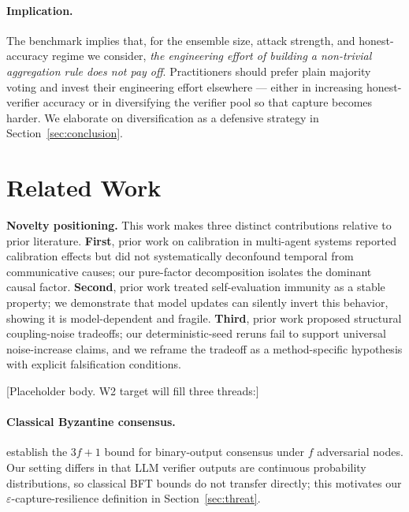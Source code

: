 \documentclass[11pt]{article}
\begin{document}
\paragraph{Implication.}
The benchmark implies that, for the ensemble size, attack strength,
and honest-accuracy regime we consider, \emph{the engineering effort
of building a non-trivial aggregation rule does not pay off}.
Practitioners should prefer plain majority voting and invest their
engineering effort elsewhere --- either in increasing honest-verifier
accuracy or in diversifying the verifier pool so that capture becomes
harder. We elaborate on diversification as a defensive strategy in
Section~\ref{sec:conclusion}.

\section{Related Work}
\textbf{Novelty positioning.} This work makes three distinct contributions relative to prior literature. \textbf{First}, prior work on calibration in multi-agent systems reported calibration effects but did not systematically deconfound temporal from communicative causes; our pure-factor decomposition isolates the dominant causal factor. \textbf{Second}, prior work treated self-evaluation immunity as a stable property; we demonstrate that model updates can silently invert this behavior, showing it is model-dependent and fragile. \textbf{Third}, prior work proposed structural coupling-noise tradeoffs; our deterministic-seed reruns fail to support universal noise-increase claims, and we reframe the tradeoff as a method-specific hypothesis with explicit falsification conditions.


\label{sec:related}

[Placeholder body. W2 target will fill three threads:]

\paragraph{Classical Byzantine consensus.}
\citet{lamport1982byzantine,castro1999pbft,yin2019hotstuff} establish the
$3f+1$ bound for binary-output consensus under $f$ adversarial nodes. Our
setting differs in that LLM verifier outputs are continuous probability
distributions, so classical BFT bounds do not transfer directly; this
motivates our $\varepsilon$-capture-resilience definition in
Section~\ref{sec:threat}.
\end{document}
